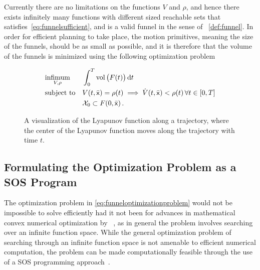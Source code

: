 Currently there are no limitations on the functions \(V\) and \(\rho\), and
hence there exists infinitely many functions with different sized reachable sets
that satisfies~\cref{eq:funnelsufficient}, and is a valid funnel in the sense of
~\cref{def:funnel}. In order for efficient planning to take place, the motion
primitives, meaning the size of the funnels, should be as small as possible, and
it is therefore that the volume of the funnels is minimized using the following
optimization problem

\begin{align}
  \label{eq:funneloptimizationproblem}
  &\underset{V,\rho}{\text{infimum}} \; &&\int_{0}^{T} \operatorname{vol}\big( F(t) \big) \, \mathrm{d}t \\
  &\text{subject to} && V(t,\bar{{\mathbf{\mathsf{x}}}}) = \rho (t) \implies \dot{V}(t,\bar{{\mathbf{\mathsf{x}}}}) < \rho (t) \, \forall t \in [0,T] \label{eq:funnel-optimization-subject-to} \\
  && &\mathcal{X}_0 \subset F(0,\bar{{\mathbf{\mathsf{x}}}}) \, . \nonumber
\end{align} 

\begin{figure}
  \caption[A converging funnel parameterized through a Lyapunov function]{A visualization of the Lyapunov function along a trajectory, where
    the center of the Lyapunov function moves along the trajectory with time
    \(t\).}
\end{figure}


\subsection{Formulating the Optimization Problem as a SOS Program}

The optimization problem in \cref{eq:funneloptimizationproblem} would not be
impossible to solve efficiently had it not been for advances in mathematical
convex numerical optimization by
\citeauthor{parilloStructuredSemidefinitePrograms}~\cite{parilloStructuredSemidefinitePrograms},
as in general the problem involves searching over an infinite function space.
While the general optimization problem of searching through an infinite function
space is not amenable to efficient numerical computation, the problem can be
made computationally feasible through the use of a \ac{SOS} programming
approach~\cite{tedrakeLQRtreesFeedbackMotion2009}.

